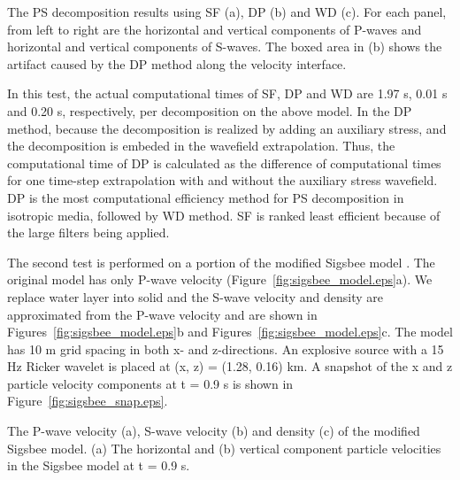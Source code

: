 \documentclass[manuscript,ulem,graphix,revised]{geophysics}
\begin{document}
{
The PS decomposition results using SF (a), DP (b) and WD (c). For each panel, from left to right are the horizontal and vertical components of P-waves and horizontal and vertical components of S-waves. The boxed area in (b) shows the artifact caused by the DP method along the velocity interface.
}

In this test, the actual computational times of SF, DP and WD are 1.97 s, 0.01 s and 0.20 s, respectively, per decomposition on the above model. In the DP method, because the decomposition is realized by adding an auxiliary stress, and the decomposition is embeded in the wavefield extrapolation. Thus, the computational time of DP is calculated as the difference of computational times for one time-step extrapolation with and without the auxiliary stress wavefield. DP is the most computational efficiency method for PS decomposition in isotropic media, followed by WD method. SF is ranked least efficient because of the large filters being applied.

The second test is performed on a portion of the modified Sigsbee model \citep{paffenholz02}. The original model has only P-wave velocity (Figure~\ref{fig:sigsbee_model.eps}a). We replace water layer into solid and the S-wave velocity and density are approximated from the P-wave velocity and are shown in Figures~\ref{fig:sigsbee_model.eps}b and Figures~\ref{fig:sigsbee_model.eps}c.
The model has 10 m grid spacing in both x- and z-directions. An explosive source with a 15 Hz Ricker wavelet is placed at (x, z) = (1.28, 0.16) km. A snapshot of the x and z particle velocity components at t = 0.9 s is shown in Figure~\ref{fig:sigsbee_snap.eps}.

{
The P-wave velocity (a), S-wave velocity (b) and density (c) of the modified Sigsbee model. 
}
{
(a) The horizontal and (b) vertical component particle velocities in the Sigsbee model at t = 0.9 s.
}
\end{document}
